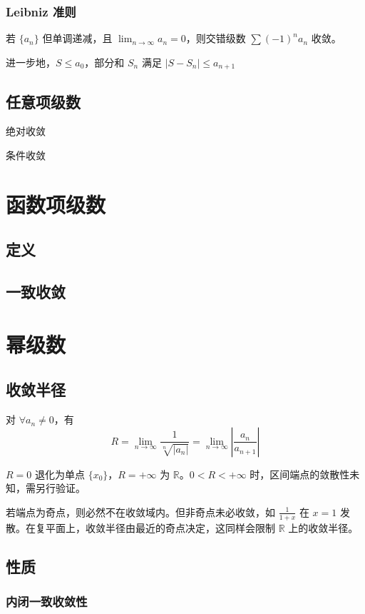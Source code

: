 \documentclass[12pt, a4paper, UTF8, openany]{ctexbook}
\newcommand{\field}[1]{\mathbb{#1}}%
\begin{document}
        \subsubsection{Leibniz 准则}
        若 $\{a_n\}$ 但单调递减，且 $\lim_{n \to \infty} a_n = 0$，则交错级数 $\sum (-1)^n a_n$ 收敛。

        进一步地，$S \leqslant a_0$，部分和 $S_n$ 满足 $|S - S_n| \leqslant a_{n + 1}$

        \subsection{任意项级数}
        绝对收敛

        条件收敛

    \section{函数项级数}
        \subsection{定义}

        \subsection{一致收敛}

    \section{幂级数}
        \subsection{收敛半径}
        对 $\forall a_n \neq 0$，有
        $$R = \lim_{n \to \infty} \frac{1}{\sqrt[n]{|a_{n}|}} = \lim_{n \to \infty} \left|\frac{a_n}{a_{n + 1}}\right|$$

        $R = 0$ 退化为单点 $\{x_0\}$，$R = +\infty$ 为 $\field{R}$。$0 < R < +\infty$ 时，区间端点的敛散性未知，需另行验证。

        若端点为奇点，则{\heiti 必然不在收敛域}内。但非奇点未必收敛，如 $\frac{1}{1 + x}$ 在 $x = 1$ 发散。在复平面上，收敛半径由最近的奇点决定，这同样会限制 $\field{R}$ 上的收敛半径。

        \subsection{性质}
        \subsubsection{内闭一致收敛性}
\end{document}
